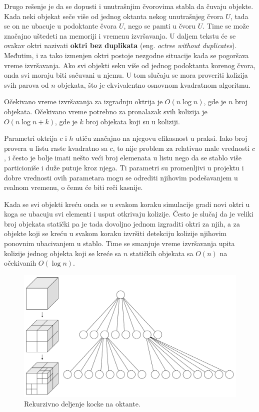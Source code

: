\documentclass[12pt,oneside]{memoir}
\begin{document}
Drugo rešenje je da se dopusti i unutrašnjim čvorovima stabla da čuvaju objekte.
Kada neki objekat seče više od jednog oktanta nekog unutrašnjeg čvora $U$, tada se on ne ubacuje 
u podoktante čvora $U$, nego se pamti u čvoru $U$. Time se može značajno uštedeti na memoriji i vremenu izvršavanja.
U daljem tekstu će se ovakav oktri nazivati \textbf{oktri bez duplikata} (eng. {\em octree without duplicates}).
Međutim, i za tako izmenjen oktri postoje nezgodne situacije kada se pogoršava vreme izvršavanja.
Ako svi objekti seku više od jednog podoktanta korenog čvora, onda svi moraju biti sačuvani u njemu. 
U tom slučaju se mora proveriti kolizija svih parova od $n$ objekata, što je ekvivalentno osnovnom kvadratnom algoritmu.

Očekivano vreme izvršavanja za izgradnju oktrija je $O(n \log n)$, gde je $n$ broj objekata.
Očekivano vreme potrebno za pronalazak svih kolizija je $O(n \log n + k)$, gde je $k$ broj objekata koji su u koliziji.

Parametri oktrija $c$ i $h$  utiču značajno na njegovu efikasnost u praksi. 
Iako broj provera u listu raste kvadratno sa $c$, to nije problem za relativno male vrednosti $c$, i često je bolje 
imati nešto veći broj elemenata u listu nego da se stablo više particioniše i duže putuje kroz njega.
Ti parametri su promenljivi u projektu i dobre vrednosti ovih parametara mogu se odrediti njihovim podešavanjem u realnom vremenu,
o čemu će biti reči kasnije.

Kada se svi objekti kreću onda se u svakom koraku simulacije  gradi novi oktri u
koga se ubacuju svi elementi i usput otkrivaju kolizije.
Često je slučaj da je veliki broj objekata statički pa je tada dovoljno jednom izgraditi oktri za njih, a za objekte koji se kreću u svakom koraku 
izvršiti detekciju kolizije njihovim ponovnim ubacivanjem u stablo. Time se smanjuje vreme izvršavanja upita 
kolizije jednog objekta koji se kreće sa $n$ statičkih objekata sa $O(n)$ na očekivanih $O(\log n)$.

\begin{figure}[h!]
	\begin{center}
	\includegraphics[scale=0.22]{octree.png}
	\end{center}
	\caption{Rekurzivno deljenje kocke na oktante.}
	\label{fig:oct}
\end{figure}
\end{document}
